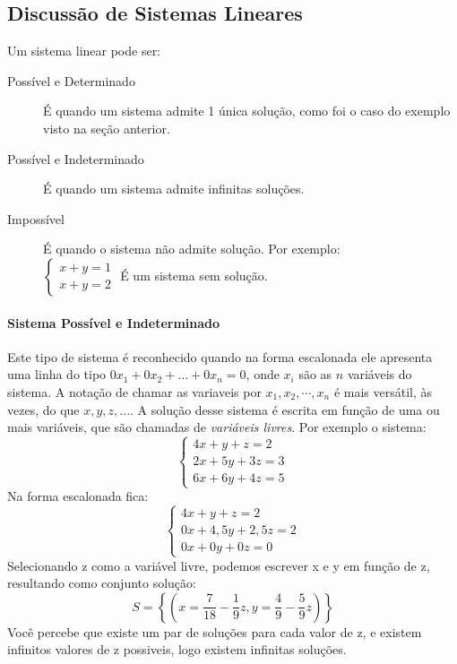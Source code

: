   \subsection{Discussão de Sistemas Lineares}
  Um sistema linear pode ser:
  \begin{description}
    \item[Possível e Determinado]É quando um sistema admite 1 única solução, como foi o caso do exemplo visto na seção
 anterior.
    \item[Possível e Indeterminado]É quando um sistema admite infinitas soluções.
    \item [Impossível]É quando o sistema não admite solução. Por exemplo:\\$\left\{\begin{array}{l}
      x+y=1\\x+y=2
    \end{array}\right.$ É um sistema sem solução.
  \end{description}
\paragraph{Sistema Possível e Indeterminado}
  Este tipo de sistema é reconhecido quando na forma escalonada ele apresenta uma linha do tipo $0x_1+0x_2+
\dots+0x_n=0$, onde $x_i$ são as $n$ variáveis do sistema. A notação de chamar as variaveis por $x_1, x_2, \cdots, x_n$ é 
mais versátil, às vezes, do que $x, y, z, ...$. A solução desse sistema é escrita em função de uma
 ou mais variáveis, que são chamadas de \textit{variáveis livres}. Por exemplo o sistema:\[
  \left\{\begin{array}{l}
    4x+y+z=2\\2x+5y+3z=3\\6x+6y+4z=5
  \end{array}\right.\]
  Na forma escalonada fica:\[
  \left\{\begin{array}{l}
    4x+y+z=2\\0x+4,5y+2,5z=2\\0x+0y+0z=0
  \end{array}\right.\]
  Selecionando z como a variável livre, podemos escrever x e y em função de z, resultando como conjunto solução:
    \[
      S=\left\{ \left( x=\frac{7}{18}-\frac{1}{9}z,y=\frac{4}{9}-\frac{5}{9}z\right)\right\}
    \]
    Você percebe que existe um par de soluções para cada valor de z, e existem infinitos valores de z possiveis, logo existem infinitas soluções.
